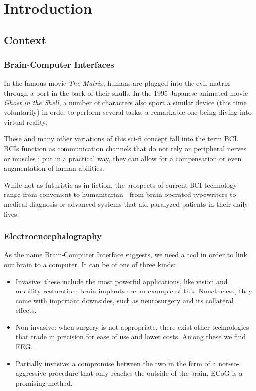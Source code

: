 \chapter{Introduction}\label{ch:introduction}

\section{Context}

	\subsection{Brain-Computer Interfaces}

		In the famous movie \textit{The Matrix}, humans are plugged into the evil matrix through a port in the back of their skulls. In the 1995 Japanese animated movie \textit{Ghost in the Shell}, a number of characters also sport a similar device (this time voluntarily) in order to perform several tasks, a remarkable one being diving into virtual reality.

		These and many other variations of this sci-fi concept fall into the term \ac{BCI}. \acs{BCI}s function as communication channels that do not rely on peripheral nerves or muscles \cite{bcidef}; put in a practical way, they can allow for a compensation or even augmentation of human abilities.

		While not as futuristic as in fiction, the prospects of current \acs{BCI} technology range from convenient to humanitarian---from brain-operated typewriters to medical diagnosis or advanced systems that aid paralyzed patients in their daily lives.

	\subsection{Electroencephalography}

		As the name Brain-Computer Interface suggests, we need a tool in order to link our brain to a computer. It can be of one of three kinds:

		\begin{itemize}

			\item
			Invasive: these include the most powerful applications, like vision and mobility restoration; brain implants are an example of this. Nonetheless, they come with important downsides, such as neurosurgery and its collateral effects.
			\item
			Non-invasive: when surgery is not appropriate, there exist other technologies that trade in precision for ease of use and lower costs. Among these we find \ac{EEG}.
			\item
			Partially invasive: a compromise between the two in the form of a not-so-aggressive procedure that only reaches the outside of the brain. \ac{ECoG} is a promising method.

		\end{itemize}

